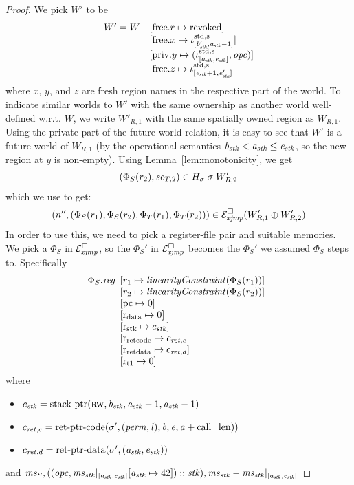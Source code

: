 \documentclass[a4paper]{article}
\begin{document}
\begin{proof}
We pick $W'$ to be
\[
  \begin{array}{r l}
    W' = W     & \update{\mathrm{free}.r}{\revoked}\\
               & \update{\mathrm{free}.x}{\stdreg{[\baddr_\stk',\aaddr_\stk -1]}{\spa}}\\
               & \update{\mathrm{priv}.y}{(\stdreg{[\aaddr_\stk,\eaddr_\stk]}{\spa},\opc)}\\
               & \update{\mathrm{free}.z}{\stdreg{[\eaddr_\stk+1,\eaddr_\stk']}{\spa}}
  \end{array}
\]
where $x$, $y$, and $z$ are fresh region names in the respective part of the world. To indicate similar worlds to $W'$ with the same ownership as another world well-defined w.r.t. $W$, we write $W'_{R,1}$ with the same spatially owned region as $W_{R,1}$. Using the private part of the future world relation, it is easy to see that $W'$ is a future world of $W_{R,1}$ (by the operational semantics $\baddr_\stk < \aaddr_\stk \leq \eaddr_\stk$, so the new region at $y$ is non-empty). Using Lemma~\ref{lem:monotonicity}, we get
\[
  (\Phi_S(r_2), \vsc_{T,2}) \in H_\sigma \; \sigma \; W'_{R,2}
\]
which we use to get:
\[
  \npair[n'']{(\Phi_S(r_1),\Phi_S(r_2),\Phi_T(r_1),\Phi_T(r_2))} \in \lrexj(W_{R,1}' \oplus W_{R,2}')
\]
In order to use this, we need to pick a register-file pair and suitable memories. We pick a $\Phi_S$ in $\lrexj$, so the $\Phi_S'$ in $\lrexj$ becomes the $\Phi_S'$ we assumed $\Phi_S$ steps to. Specifically
\[
  \Phi_S.\reg
  \begin{array}[t]{l}
    \update{r_1}{\linCons{\Phi_S(r_1)}}\\
    \update{r_2}{\linCons{\Phi_S(r_2)}}\\
    \update{\pcreg}{0} \\
    \update{\rdata}{0} \\
    \update{\rstk}{c_\stk}\\
    \update{\rretc}{c_{\ret,c}}\\
    \update{\rretd}{c_{\ret,d}}\\
    \update{\rtmp{1}}{0}\\
  \end{array}
\]
where
\begin{itemize}
\item $c_\stk = \stkptr{\rw,\baddr_\stk,\aaddr_\stk-1,\aaddr_\stk-1}$
\item $c_{\ret,c} = \retptrc(\sigma',(\perm,\lin),\baddr,\eaddr,\aaddr+\calllen))$
\item $c_{\ret,d} = \retptrd(\sigma',(\aaddr_\stk,\eaddr_\stk))$
\end{itemize}
and
$\ms_S,((\opc,\ms_\stk|_{[\aaddr_\stk,\eaddr_\stk]}\update{\aaddr_\stk}{42}) :: \stk),\ms_\stk-\ms_\stk|_{[\aaddr_\stk,\eaddr_\stk]}$


\end{proof}
\end{document}

